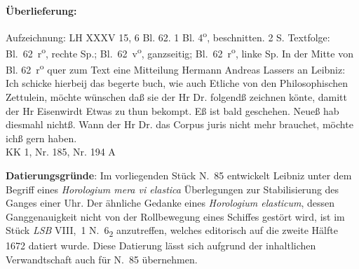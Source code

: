       
               
                \begin{ledgroupsized}[r]{120mm}
                \footnotesize 
                \pstart                
                \noindent\textbf{\"{U}berlieferung:}   
                \pend
                \end{ledgroupsized}
            
              
                            \begin{ledgroupsized}[r]{114mm}
                            \footnotesize 
                            \pstart \parindent -6mm
                            Aufzeichnung: LH XXXV 15, 6 Bl. 62.
1 Bl. 4\textsuperscript{o}, beschnitten.
2 S. Textfolge: Bl.~62~r\textsuperscript{o}, rechte Sp.; Bl.~62~v\textsuperscript{o}, ganzseitig; Bl.~62~r\textsuperscript{o}, linke Sp.
In der Mitte von Bl. 62~r\textsuperscript{o} quer zum Text eine Mitteilung Hermann Andreas Lassers%
\protect{} an Leibniz:
\glqq
Ich schicke hierbeij das begerte buch,
wie auch Etliche von den Philosophischen Zettulein,
m\"{o}chte w\"{u}nschen da{\ss} sie der Hr Dr. folgend{\ss} zeichnen k\"{o}nte,
damitt der Hr Eisenwirdt\protect{} Etwas zu thun bekompt.
E{\ss} ist  bald geschehen.
Neue{\ss} hab diesmahl nicht{\ss}.
Wann der Hr Dr.\protect{} das Corpus juris nicht mehr brauchet,
m\"{o}chte ich{\ss} gern haben.%
\grqq%
\\KK 1, Nr. 185, Nr. 194 A \pend
\end{ledgroupsized}
                \vspace*{5mm}
                \begin{ledgroup}
                \footnotesize 
                \pstart
            \noindent\footnotesize{\textbf{Datierungsgr\"{u}nde}: Im vorliegenden Stück N.~85 %
entwickelt Leibniz unter dem Begriff eines \textit{Horologium mera vi elastica}
\"{U}berlegungen zur Stabilisierung des Ganges einer Uhr.
Der ähnliche Gedanke eines \textit{Horologium elasticum},
dessen Ganggenauigkeit nicht von der Rollbewegung eines Schiffes gestört wird,
ist im Stück \cite{01072}\textit{LSB} VIII,~1 N.~6\textsubscript{2} anzutreffen,
welches editorisch auf die zweite H\"{a}lfte 1672 datiert wurde.
Diese Datierung lässt sich aufgrund der inhaltlichen Verwandtschaft auch für N.~85 übernehmen.}
                \pend
                \end{ledgroup}
            
